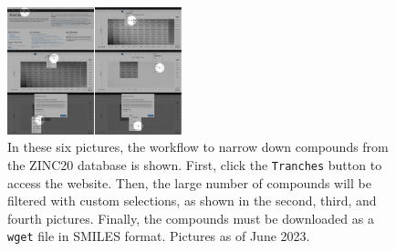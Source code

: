\documentclass[9pt,tutorial]{livecoms}
\begin{document}
\begin{figure}[H]
\centering
\includegraphics[width=0.45\textwidth]{figures/zincligands_download_guide.pdf}
\caption{In these six pictures, the workflow to narrow down compounds from the ZINC20 database is shown. First, click the \texttt{Tranches} button to access the website. Then, the large number of compounds will be filtered with custom selections, as shown in the second, third, and fourth pictures. Finally, the compounds must be downloaded as a \texttt{wget} file in SMILES format. Pictures as of June 2023.}
\label{fig:zincligands_download_guide}
\end{figure}
\end{document}
